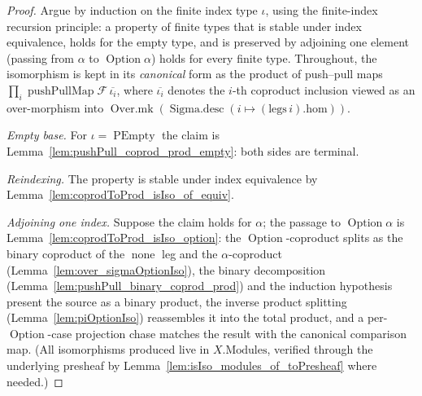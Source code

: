 \begin{proof}
  Argue by induction on the finite index type \(\iota\), using the finite-index recursion principle: a
  property of finite types that is stable under index equivalence, holds for the empty type, and is
  preserved by adjoining one element (passing from \(\alpha\) to \(\operatorname{Option}\alpha\)) holds
  for every finite type. Throughout, the isomorphism is kept in its \emph{canonical} form as
  the product of push--pull maps \(\prod_{i} \operatorname{pushPullMap}\mathcal{F}\,\overline{\iota_i}\),
  where \(\overline{\iota_i}\) denotes the \(i\)-th coproduct inclusion viewed as an over-morphism
  into \(\operatorname{Over.mk}(\operatorname{Sigma.desc}(i \mapsto (\mathrm{legs}\,i).\mathrm{hom}))\).

  \emph{Empty base.} For \(\iota = \operatorname{PEmpty}\) the claim is
  Lemma~\ref{lem:pushPull_coprod_prod_empty}: both sides are terminal.

  \emph{Reindexing.} The property is stable under index equivalence by
  Lemma~\ref{lem:coprodToProd_isIso_of_equiv}.

  \emph{Adjoining one index.} Suppose the claim holds for \(\alpha\); the passage to
  \(\operatorname{Option}\alpha\) is Lemma~\ref{lem:coprodToProd_isIso_option}: the
  \(\operatorname{Option}\)-coproduct splits as the binary coproduct of the \(\operatorname{none}\) leg
  and the \(\alpha\)-coproduct (Lemma~\ref{lem:over_sigmaOptionIso}), the binary decomposition
  (Lemma~\ref{lem:pushPull_binary_coprod_prod}) and the induction hypothesis present the source as a
  binary product, the inverse product splitting (Lemma~\ref{lem:piOptionIso}) reassembles it into the
  total product, and a per-\(\operatorname{Option}\)-case projection chase matches the result with the
  canonical comparison map. (All isomorphisms produced live in \(X.\mathrm{Modules}\), verified through
  the underlying presheaf by Lemma~\ref{lem:isIso_modules_of_toPresheaf} where needed.)
\end{proof}

